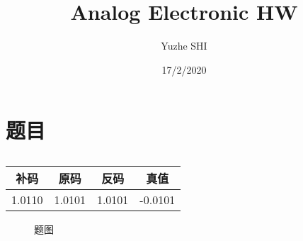 \documentclass{ctexart}
\title{Analog Electronic HW}
\author{Yuzhe SHI}
\date{17/2/2020}
\begin{document}
\maketitle
\section{题目}
 



\begin{table}[h]
    \centering
    \begin{tabular}{c|c|c|c}
    \hline
         补码&原码&反码&真值  \\
         \hline
         1.0110&1.0101&1.0101&-0.0101\\
         \hline
    \end{tabular}
    \caption{}
    \label{tab:my_label}
\end{table}


\begin{figure}[h]
    \centering
    \caption{题图}
    \label{fig 1}
\end{figure}
\end{document}
